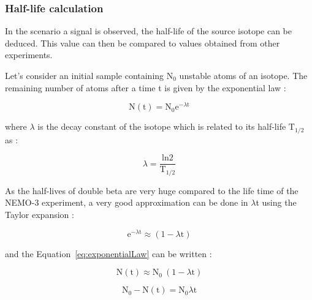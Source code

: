 \documentclass[main.tex]{subfiles}
\begin{document}
\FloatBarrier


\subsubsection{Half-life calculation}\label{sec:HalfLifeAnalysis}


\NI In the scenario a signal is observed, the half-life of the source isotope can be deduced. This value can then be compared to values obtained from other experiments.


\bigskip


\NI Let's consider an initial sample containing N$_\text{0}$ unstable atoms of an isotope. The remaining number of atoms after a time t is given by the exponential law :  


\begin{equation}\label{eq:exponentialLaw}
\text{N}(\text{t}) = \text{N}_\text{0} \text{e}^{-\lambda \text{t}}
\end{equation}


\bigskip


\NI where $\lambda$ is the decay constant of the isotope which is related to its half-life $\text{T}_{\text{1/2}}$ as : 


\begin{equation}\label{eq:lambda}
\lambda = \frac{\text{ln2}}{\text{T}_{\text{1/2}}}
\end{equation}


\bigskip


\NI As the half-lives of double beta are very huge compared to the life time of the NEMO-3 experiment, a very good approximation can be done in $\lambda$t using the Taylor expansion :  


\begin{equation}
\text{e}^{-\lambda \text{t}} \approx (\text{1}-\lambda \text{t})
\end{equation}


\bigskip


\NI and the Equation~\ref{eq:exponentialLaw} can be written :


\begin{equation}
\text{N}(\text{t}) \approx \text{N}_\text{0}~(\text{1} - \lambda \text{t})
\end{equation}

\begin{equation}\label{eq:N0}
\text{N}_\text{0} - \text{N} (\text{t}) = \text{N}_\text{0} \lambda \text{t}
\end{equation}
\end{document}
